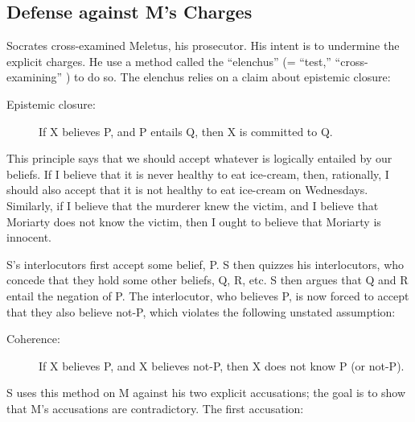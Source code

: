 \documentclass[oneside]{article}
\begin{document}
\begin{description}



\section*{Defense against M's Charges}
Socrates cross-examined Meletus, his prosecutor. His intent is to undermine the explicit charges.  He use a method called the ``elenchus'' (= ``test,'' ``cross-examining'' ) to do so. The elenchus relies on a claim about epistemic closure: 

\begin{description}
\item[Epistemic closure:] If X believes P, and P entails Q, then X is committed to Q.
\end{description}
This principle says that we should accept whatever is logically entailed by our beliefs. If I believe that it is never healthy to eat ice-cream, then, rationally, I should also accept that it is not healthy to eat ice-cream on Wednesdays. Similarly, if I believe that the murderer knew the victim, and I believe that Moriarty does not know the victim, then I ought to believe that Moriarty is innocent. 

S's interlocutors first accept some belief, P. S then quizzes his interlocutors, who concede that they hold some other beliefs, Q, R, etc. S then argues that Q and R entail the negation of P. The interlocutor, who believes P, is now forced to accept that they also believe not-P, which violates the following unstated assumption: 
\begin{description}
\item[Coherence:] If X believes P, and X believes not-P, then X does not know P (or not-P). 
\end{description}
S uses this method on M against his two explicit accusations; the goal is to show that M's accusations are contradictory. The first accusation: 


\end{description}
\end{document}
